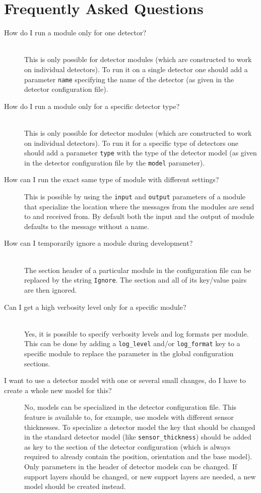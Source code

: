 \section{Frequently Asked Questions}
\label{sec:faq}
\begin{description}
\item[How do I run a module only for one detector?]\mbox{}\\
This is only possible for detector modules (which are constructed to work on individual detectors). To run it on a single detector one should add a parameter \texttt{name} specifying the name of the detector (as given in the detector configuration file).
\item[How do I run a module only for a specific detector type?]\mbox{}\\ This is only possible for detector modules (which are constructed to work on individual detectors). To run it for a specific type of detectors one should add a parameter \texttt{type} with the type of the detector model (as given in the detector configuration file by the \texttt{model} parameter).
\item[How can I run the exact same type of module with different settings?] This is possible by using the \texttt{input} and \texttt{output} parameters of a module that specialize the location where the messages from the modules are send to and received from. By default both the input and the output of module defaults to the message without a name.
\item[How can I temporarily ignore a module during development?]\mbox{}\\ The section header of a particular module in the configuration file can be replaced by the string \texttt{Ignore}. The section and all of its key/value pairs are then ignored.
\item[Can I get a high verbosity level only for a specific module?]\mbox{}\\ Yes, it is possible to specify verbosity levels and log formats per module. This can be done by adding a \texttt{log\_level} and/or \texttt{log\_format} key to a specific module to replace the parameter in the global configuration sections.
\item[I want to use a detector model with one or several small changes, do I have to create a whole new model for this?] No, models can be specialized in the detector configuration file. This feature is available to, for example, use models with different sensor thicknesses. To specialize a detector model the key that should be changed in the standard detector model (like \texttt{sensor\_thickness}) should be added as key to the section of the detector configuration (which is always required to already contain the position, orientation and the base model). Only parameters in the header of detector models can be changed. If support layers should be changed, or new support layers are needed, a new model should be created instead.

\end{description}

